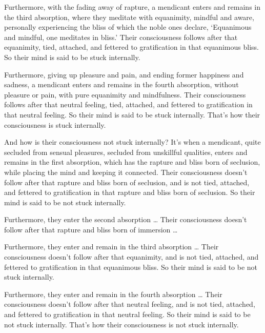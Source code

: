 \documentclass[12pt,openany]{book}%
\begin{document}
Furthermore, with the fading away of rapture, a mendicant enters and remains in the third absorption, where they meditate with equanimity, mindful and aware, personally experiencing the bliss of which the noble ones declare, ‘Equanimous and mindful, one meditates in bliss.’ Their consciousness follows after that equanimity, tied, attached, and fettered to gratification in that equanimous bliss. So their mind is said to be stuck internally. 

Furthermore, giving up pleasure and pain, and ending former happiness and sadness, a mendicant enters and remains in the fourth absorption, without pleasure or pain, with pure equanimity and mindfulness. Their consciousness follows after that neutral feeling, tied, attached, and fettered to gratification in that neutral feeling. So their mind is said to be stuck internally. That’s how their consciousness is stuck internally. 

And how is their consciousness not stuck internally? It’s when a mendicant, quite secluded from sensual pleasures, secluded from unskillful qualities, enters and remains in the first absorption, which has the rapture and bliss born of seclusion, while placing the mind and keeping it connected. Their consciousness doesn’t follow after that rapture and bliss born of seclusion, and is not tied, attached, and fettered to gratification in that rapture and bliss born of seclusion. So their mind is said to be not stuck internally. 

Furthermore, they enter the second absorption … Their consciousness doesn’t follow after that rapture and bliss born of immersion … 

Furthermore, they enter and remain in the third absorption … Their consciousness doesn’t follow after that equanimity, and is not tied, attached, and fettered to gratification in that equanimous bliss. So their mind is said to be not stuck internally. 

Furthermore, they enter and remain in the fourth absorption … Their consciousness doesn’t follow after that neutral feeling, and is not tied, attached, and fettered to gratification in that neutral feeling. So their mind is said to be not stuck internally. That’s how their consciousness is not stuck internally. 
\end{document}
